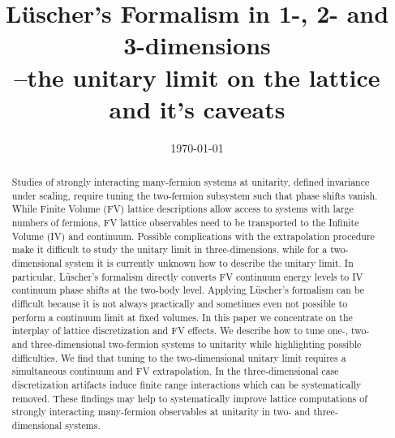 \documentclass[aps,superscriptaddress,tightenlines,nofootinbib,floatfix,longbibliography,notitlepage]{revtex4-1}
\begin{document}
\title{L\"{u}scher's Formalism in 1-, 2- and 3-dimensions\\--the unitary limit on the lattice and it's caveats}





\date{\today}

\begin{abstract}
Studies of strongly interacting many-fermion systems at unitarity, defined invariance under scaling, require tuning the two-fermion subsystem such that phase shifts vanish.
While Finite Volume (FV) lattice descriptions allow access to systems with large numbers of fermions, FV lattice observables need to be transported to the Infinite Volume (IV) and continuum.
Possible complications with the extrapolation procedure make it difficult to study the unitary limit in three-dimensions, while for a two-dimensional system it is currently unknown how to describe the unitary limit.
In particular, L\"{u}scher's formalism directly converts FV continuum energy levels to IV continuum phase shifts at the two-body level.
Applying L\"{u}scher's formalism can be difficult because it is not always practically and sometimes even not possible to perform a continuum limit at fixed volumes.
In this paper we concentrate on the interplay of lattice discretization and FV effects.
We describe how to tune one-, two- and three-dimensional two-fermion systems to unitarity while highlighting possible difficulties.
We find that tuning to the two-dimensional unitary limit requires a simultaneous continuum and FV extrapolation.
In the three-dimensional case discretization artifacts induce finite range interactions which can be systematically removed.
These findings may help to systematically improve lattice computations of strongly interacting many-fermion observables at unitarity in two- and three-dimensional systems.
\end{abstract}

\maketitle








\appendix



\end{document}

